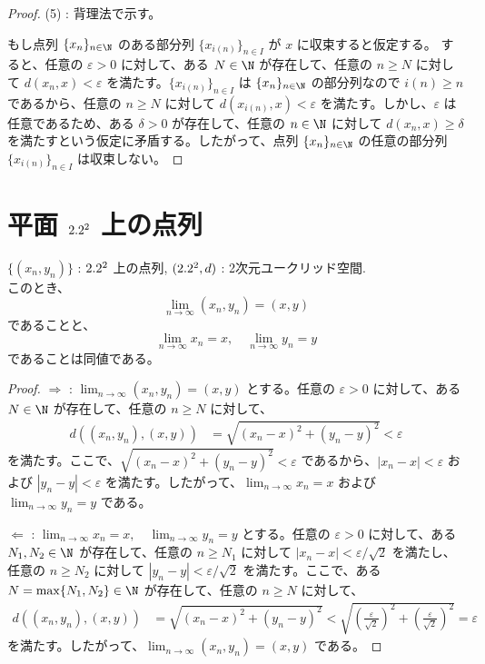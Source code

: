 \documentclass[article,paper=a4paper]{jlreq}
\begin{document}
\begin{proof}
(5) : 背理法で示す。

もし点列 $\{x_n\}_{n \in \N}$ のある部分列 $\{x_{i(n)}\}_{n \in I}$ が $x$ に収束すると仮定する。
すると、任意の $\varepsilon > 0$ に対して、ある $N \in \N$ が存在して、任意の $n \geq N$ に対して $d(x_n,x) < \varepsilon$ を満たす。$\{x_{i(n)}\}_{n \in I}$ は $\{x_n\}_{n \in \N}$ の部分列なので $i(n) \geq n$ であるから、任意の $n \geq N$ に対して $d(x_{i(n)},x) < \varepsilon$ を満たす。しかし、$\varepsilon$ は任意であるため、ある $\delta > 0$ が存在して、任意の $n \in \N$ に対して $d(x_n,x) \geq \delta$ を満たすという仮定に矛盾する。したがって、点列 $\{x_n\}_{n \in \N}$ の任意の部分列 $\{x_{i(n)}\}_{n \in I}$ は収束しない。
\end{proof}


\section{平面 \texorpdfstring{$2.2^2$}{R2} 上の点列}
\begin{thm}
    \quad $\{(x_n,y_n)\}$ : $2.2^2$ 上の点列, $(2.2^2,d)$ : 2次元ユークリッド空間.\\
   このとき、
   \[\lim_{n \to \infty} (x_n,y_n) = (x,y)\]
   であることと、
   \[\lim_{n \to \infty} x_n = x, \quad \lim_{n \to \infty} y_n = y\]
   であることは同値である。
\end{thm}

\begin{proof}
    $\Rightarrow$ : $\lim_{n \to \infty} (x_n,y_n) = (x,y)$ とする。任意の $\varepsilon > 0$ に対して、ある $N \in \N$ が存在して、任意の $n \geq N$ に対して、
    \begin{align*}
        d((x_n,y_n),(x,y)) &= \sqrt{(x_n - x)^2 + (y_n - y)^2} < \varepsilon
    \end{align*}
    を満たす。ここで、$\sqrt{(x_n - x)^2 + (y_n - y)^2} < \varepsilon$ であるから、$\left\lvert x_n - x \right\rvert < \varepsilon$ および $\left\lvert y_n - y \right\rvert < \varepsilon$ を満たす。したがって、$\lim_{n \to \infty} x_n = x$ および $\lim_{n \to \infty} y_n = y$ である。

    $\Leftarrow$ : $\lim_{n \to \infty} x_n = x, \quad \lim_{n \to \infty} y_n = y$ とする。任意の $\varepsilon > 0$ に対して、ある $N_1, N_2 \in \N$ が存在して、任意の $n \geq N_1$ に対して $\left\lvert x_n - x\right\rvert < \varepsilon/\sqrt{2}$ を満たし、任意の $n \geq N_2$ に対して $\left\lvert y_n - y\right\rvert < \varepsilon/\sqrt{2}$ を満たす。ここで、ある $N = \max\{N_1,N_2\} \in \N$ が存在して、任意の $n \geq N$ に対して、
    \begin{align*}
        d((x_n,y_n),(x,y)) &= \sqrt{(x_n - x)^2 + (y_n - y)^2} < \sqrt{\left(\frac{\varepsilon}{\sqrt{2}}\right)^2 + \left(\frac{\varepsilon}{\sqrt{2}}\right)^2} = \varepsilon
    \end{align*}
    を満たす。したがって、$\lim_{n \to \infty} (x_n,y_n) = (x,y)$ である。
\end{proof}
\end{document}
